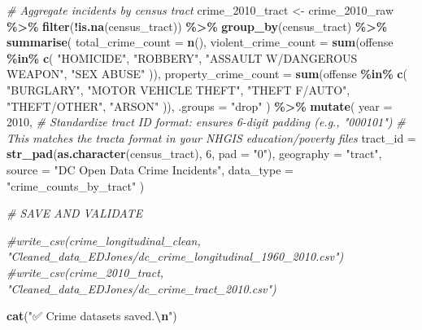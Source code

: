 \documentclass[
]{article}
\newenvironment{Shaded}{\begin{snugshade}}{\end{snugshade}}
\newcommand{\AttributeTok}[1]{\textcolor[rgb]{0.13,0.29,0.53}{#1}}
\newcommand{\CommentTok}[1]{\textcolor[rgb]{0.56,0.35,0.01}{\textit{#1}}}
\newcommand{\DecValTok}[1]{\textcolor[rgb]{0.00,0.00,0.81}{#1}}
\newcommand{\FunctionTok}[1]{\textcolor[rgb]{0.13,0.29,0.53}{\textbf{#1}}}
\newcommand{\NormalTok}[1]{#1}
\newcommand{\OtherTok}[1]{\textcolor[rgb]{0.56,0.35,0.01}{#1}}
\newcommand{\SpecialCharTok}[1]{\textcolor[rgb]{0.81,0.36,0.00}{\textbf{#1}}}
\newcommand{\StringTok}[1]{\textcolor[rgb]{0.31,0.60,0.02}{#1}}
\begin{document}
\begin{Shaded}
\begin{Highlighting}[]
\CommentTok{\# Aggregate incidents by census tract}
\NormalTok{crime\_2010\_tract }\OtherTok{\textless{}{-}}\NormalTok{ crime\_2010\_raw }\SpecialCharTok{\%\textgreater{}\%}
  \FunctionTok{filter}\NormalTok{(}\SpecialCharTok{!}\FunctionTok{is.na}\NormalTok{(census\_tract)) }\SpecialCharTok{\%\textgreater{}\%}
  \FunctionTok{group\_by}\NormalTok{(census\_tract) }\SpecialCharTok{\%\textgreater{}\%}
  \FunctionTok{summarise}\NormalTok{(}
    \AttributeTok{total\_crime\_count =} \FunctionTok{n}\NormalTok{(),}
    \AttributeTok{violent\_crime\_count =} \FunctionTok{sum}\NormalTok{(offense }\SpecialCharTok{\%in\%} \FunctionTok{c}\NormalTok{(}
      \StringTok{"HOMICIDE"}\NormalTok{, }\StringTok{"ROBBERY"}\NormalTok{, }\StringTok{"ASSAULT W/DANGEROUS WEAPON"}\NormalTok{, }\StringTok{"SEX ABUSE"}
\NormalTok{    )),}
    \AttributeTok{property\_crime\_count =} \FunctionTok{sum}\NormalTok{(offense }\SpecialCharTok{\%in\%} \FunctionTok{c}\NormalTok{(}
      \StringTok{"BURGLARY"}\NormalTok{, }\StringTok{"MOTOR VEHICLE THEFT"}\NormalTok{, }\StringTok{"THEFT F/AUTO"}\NormalTok{, }\StringTok{"THEFT/OTHER"}\NormalTok{, }\StringTok{"ARSON"}
\NormalTok{    )),}
    \AttributeTok{.groups =} \StringTok{"drop"}
\NormalTok{  ) }\SpecialCharTok{\%\textgreater{}\%}
  \FunctionTok{mutate}\NormalTok{(}
    \AttributeTok{year =} \DecValTok{2010}\NormalTok{,}
    \CommentTok{\# Standardize tract ID format: ensures 6{-}digit padding (e.g., "000101")}
    \CommentTok{\# This matches the \textquotesingle{}tracta\textquotesingle{} format in your NHGIS education/poverty files}
    \AttributeTok{tract\_id =} \FunctionTok{str\_pad}\NormalTok{(}\FunctionTok{as.character}\NormalTok{(census\_tract), }\DecValTok{6}\NormalTok{, }\AttributeTok{pad =} \StringTok{"0"}\NormalTok{),}
    \AttributeTok{geography =} \StringTok{"tract"}\NormalTok{,}
    \AttributeTok{source =} \StringTok{"DC Open Data Crime Incidents"}\NormalTok{,}
    \AttributeTok{data\_type =} \StringTok{"crime\_counts\_by\_tract"}
\NormalTok{  )}


\CommentTok{\# SAVE AND VALIDATE}

\CommentTok{\#write\_csv(crime\_longitudinal\_clean, "Cleaned\_data\_EDJones/dc\_crime\_longitudinal\_1960\_2010.csv")}
\CommentTok{\#write\_csv(crime\_2010\_tract, "Cleaned\_data\_EDJones/dc\_crime\_tract\_2010.csv")}

\FunctionTok{cat}\NormalTok{(}\StringTok{"✅ Crime datasets saved.}\SpecialCharTok{\textbackslash{}n}\StringTok{"}\NormalTok{)}
\end{Highlighting}
\end{Shaded}
\end{document}
